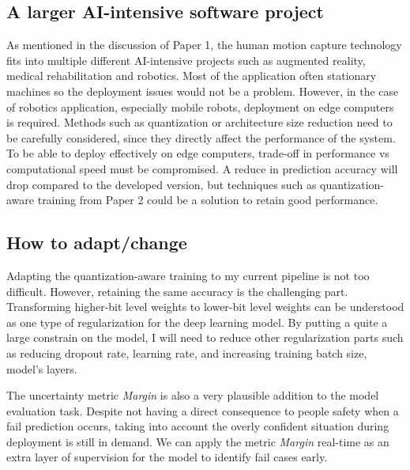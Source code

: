 \documentclass{article}
\begin{document}
\subsection{A larger AI-intensive software project}
As mentioned in the discussion of Paper 1, the human motion capture technology fits into multiple different AI-intensive projects such as augmented reality, medical rehabilitation and robotics. Most of the application often stationary machines so the deployment issues would not be a problem. However, in the case of robotics application, especially mobile robots, deployment on edge computers is required. Methods such as quantization or architecture size reduction need to be carefully considered, since they directly affect the performance of the system. To be able to deploy effectively on edge computers, trade-off in performance vs computational speed must be compromised. A reduce in prediction accuracy will drop compared to the developed version, but techniques such as quantization-aware training from Paper 2 could be a solution to retain good performance. 

\subsection{How to adapt/change}
Adapting the quantization-aware training to my current pipeline is not too difficult. However, retaining the same accuracy is the challenging part. Transforming higher-bit level weights to lower-bit level weights can be understood as one type of regularization for the deep learning model. By putting a quite a large constrain on the model, I will need to reduce other regularization parts such as reducing dropout rate, learning rate, and increasing training batch size, model's layers.

The uncertainty metric \textit{Margin} is also a very plausible addition to the model evaluation task. Despite not having a direct consequence to people safety when a fail prediction occurs, taking into account the overly confident situation during deployment is still in demand. We can apply the metric \textit{Margin} real-time as an extra layer of supervision for the model to identify fail cases early. 
\end{document}
